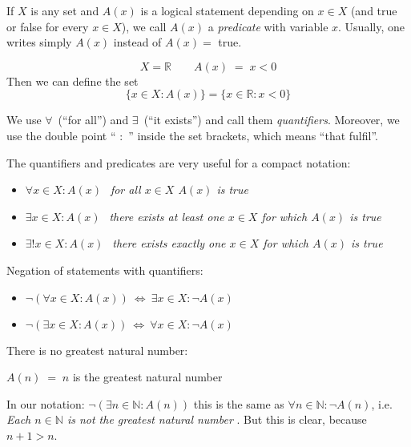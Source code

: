 

\begin{Definition}[Predicate]
If $X$ is any set and $A(x)$ is a logical statement depending on $x \in X$ (and true or false for every $x\in X$),
we call $A(x)$ a \emph{predicate} with variable $x$.
Usually, one writes simply $A(x)$ instead of $A(x)=$ true. 
\end{Definition}

\begin{example}{}
\[
 X=\mathbb{R}\qquad   A(x) \;=\; x < 0
\]
Then we can define the set
	$$
	\{ x \in X : A(x) \}	= \{ x \in \mathbb{R} : x < 0 \}
	$$
\end{example}

\begin{Definition}
We use
$\forall$~(``for all'') and $\exists$~(``it exists'')
and call them \emph{quantifiers}.
Moreover, we use
the double point `` $:$ '' inside the set brackets, which means
``that fulfil''.  
\end{Definition}


The quantifiers and predicates are very useful for a compact notation:
\begin{itemize}
 \item $\forall x \in X : A(x)~~$  \emph{for all $x\in X$ $A(x)$ is true}
 \item $\exists x \in X : A(x)~~$  \emph{there exists at least one $x\in X$ for which $A(x)$ is true}
 \item $\exists! x \in X : A(x)~~$ \emph{there exists exactly one $x\in X$ for which $A(x)$ is true}
\end{itemize}

Negation of statements with quantifiers:
\begin{itemize}
 \item $\neg (\forall x \in X : A(x)) ~\Leftrightarrow~ \exists x \in X : \neg A(x)$
 \item $\neg (\exists x \in X : A(x)) ~\Leftrightarrow~ \forall x \in X : \neg A(x)$
\end{itemize}

\begin{example}
There is no greatest natural number:
\begin{center}
 $A(n) \;=\; n$ is the greatest natural number
\end{center}
In our notation: $\neg (\exists n \in \mathbb{N} : A(n))$ this is the same as $\forall n \in \mathbb{N} : \neg A(n)$,
i.e. \emph{Each $n \in \mathbb{N}$ is not the greatest natural number }.
But this is clear, because $n+1 > n$. 
\end{example}


